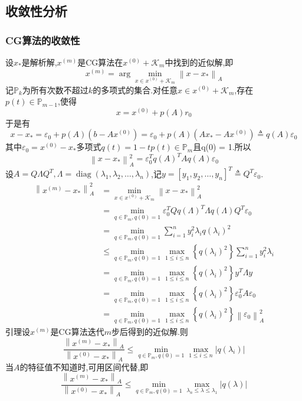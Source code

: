 \documentclass[12pt,a4paper]{article}
\begin{document}
\subsection{收敛性分析}
\subsubsection*{CG算法的收敛性}
设$x_{*}$是解析解,$x^{(m)}$是CG算法在$x^{(0)}+\mathcal{K}_{m}$中找到的近似解,即
$$
x^{(m)}=\arg \min _{x \in x^{(0)}+\mathcal{K}_{m}}\left\|x-x_{*}\right\|_{A}
$$
记$\mathbb{P}_{k}$为所有次数不超过$k$的多项式的集合.对任意$x \in x^{(0)}+\mathcal{K}_{m}$,存在$p(t) \in \mathbb{P}_{m-1}$,使得
$$
x=x^{(0)}+p(A) r_{0}
$$
于是有
$$
x-x_{*}=\varepsilon_{0}+p(A)\left(b-A x^{(0)}\right)=\varepsilon_{0}+p(A)\left(A x_{*}-A x^{(0)}\right) \triangleq q(A) \varepsilon_{0}
$$
其中$\varepsilon_{0}=x^{(0)}-x_{*}$多项式$q(t)=1-t p(t) \in \mathbb{P}_{m}$且q(0) = 1.所以
$$
\left\|x-x_{*}\right\|_{A}^{2}=\varepsilon_{0}^{T} q(A)^{T} A q(A) \varepsilon_{0}
$$
设$A=Q \Lambda Q^{T}, \Lambda=\operatorname{diag}\left(\lambda_{1}, \lambda_{2}, \ldots, \lambda_{n}\right)$,记$y=\left[y_{1}, y_{2}, \ldots, y_{n}\right]^{T} \triangleq Q^{T} \varepsilon_{0}$.
$$
\begin{aligned}
\left\|x^{(m)}-x_{*}\right\|_{A}^{2} &=\min _{x \in x^{(0)}+\mathcal{K}_{m}}\left\|x-x_{*}\right\|_{A}^{2} \\ 
&=\min _{q \in \mathbb{P}_{m}, q(0)=1} \varepsilon_{0}^{T} Q q(\Lambda)^{T} \Lambda q(\Lambda) Q^{T} \varepsilon_{0} \\ 
&=\min _{q \in \mathbb{P}_{m}, q(0)=1} \sum_{i=1}^{n} y_{i}^{2} \lambda_{i} q\left(\lambda_{i}\right)^{2}\\
&\leq \min _{q \in \mathbb{P}_{m}, q(0)=1} \max _{1 \leq i \leq n}\left\{q\left(\lambda_{i}\right)^{2}\right\} \sum_{i=1}^{n} y_{i}^{2} \lambda_{i}\\
&=\min _{q \in \mathbb{P}_{m}, q(0)=1} \max _{1 \leq i \leq n}\left\{q\left(\lambda_{i}\right)^{2}\right\} y^{T} \Lambda y\\
&=\min _{q \in \mathbb{P}_{m}, q(0)=1} \max _{1 \leq i \leq n}\left\{q\left(\lambda_{i}\right)^{2}\right\} \varepsilon_{0}^{T} A \varepsilon_{0}\\
&=\min _{q \in \mathbb{P}_{m}, q(0)=1} \max _{1 \leq i \leq n}\left\{q\left(\lambda_{i}\right)^{2}\right\}\left\|\varepsilon_{0}\right\|_{A}^{2}
\end{aligned}
$$
{\color{blue}引理}\qquad 设$x^{(m)}$是CG算法迭代$m$步后得到的近似解.则
$$
\frac{\left\|x^{(m)}-x_{*}\right\|_{A}}{\left\|x^{(0)}-x_{*}\right\|_{A}} \leq \min _{q \in \mathbb{P}_{m}, q(0)=1} \max _{1 \leq i \leq n}\left|q\left(\lambda_{i}\right)\right|
$$
当$A$的特征值不知道时,可用区间代替,即
$$
\frac{\left\|x^{(m)}-x_{*}\right\|_{A}}{\left\|x^{(0)}-x_{*}\right\|_{A}} \leq \min _{q \in \mathbb{P}_{m}, q(0)=1} \max _{\lambda_{n} \leq \lambda \leq \lambda_{1}}|q(\lambda)|
$$
\end{document}
